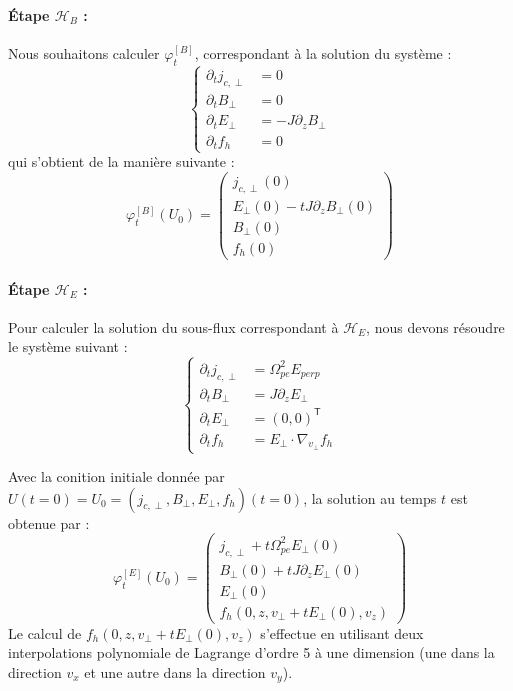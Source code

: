 \paragraph{Étape $\mathcal{H}_B$ :\\}
Nous souhaitons calculer $\varphi_t^{[B]}$, correspondant à la solution du système :
$$
  \begin{cases}
    \partial_t j_{c,\perp} &= 0 \\
    \partial_t B_\perp     &= 0 \\
    \partial_t E_\perp     &= -J\partial_zB_\perp \\
    \partial_t f_h         &= 0
  \end{cases}
$$
qui s'obtient de la manière suivante :
$$
  \varphi_t^{[B]}(U_0) = \begin{pmatrix}
    j_{c,\perp}(0) \\
    E_\perp(0) - tJ\partial_zB_\perp(0) \\
    B_\perp(0) \\
    f_h(0)
  \end{pmatrix}
$$


\paragraph{Étape $\mathcal{H}_E$ :\\}
Pour calculer la solution du sous-flux correspondant à $\mathcal{H}_E$, nous devons résoudre le système suivant :
$$
  \begin{cases}
    \partial_t j_{c,\perp} &= \Omega_{pe}^2E_{perp} \\
    \partial_t B_\perp     &= J\partial_zE_\perp \\
    \partial_t E_\perp     &= (0,0)^\mathsf{T} \\
    \partial_t f_h         &= E_\perp\cdot\nabla_{v_\perp}f_h
  \end{cases}
$$

Avec la conition initiale donnée par $U(t=0)=U_0=(j_{c,\perp},B_\perp,E_\perp,f_h)(t=0)$, la solution au temps $t$ est obtenue par :
$$
  \varphi_t^{[E]}(U_0) = \begin{pmatrix}
    j_{c,\perp} + t\Omega_{pe}^2E_\perp(0)\\
    B_\perp(0)+tJ\partial_zE_\perp(0) \\
    E_\perp(0) \\
    f_h(0,z,v_\perp+tE_\perp(0),v_z)
  \end{pmatrix}
$$
Le calcul de $f_h(0,z,v_\perp+tE_\perp(0),v_z)$ s'effectue en utilisant deux interpolations polynomiale de Lagrange d'ordre 5 à une dimension (une dans la direction $v_x$ et une autre dans la direction $v_y$).

